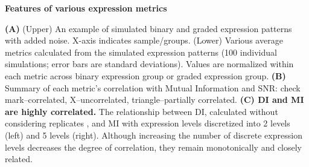 \textbf{Features of various expression metrics}

\textbf{(A)} (Upper) An example of simulated binary and graded expression patterns with added noise. X-axis indicates sample/groups. (Lower) Various average metrics calculated from the simulated expression patterns (100 individual simulations; error bars are standard deviations). Values are normalized within each metric across binary expression group or graded expression group. 
\textbf{(B)} Summary of each metric's correlation with Mutual Information and SNR: check mark--correlated, X--uncorrelated, triangle--partially correlated.
\textbf{(C) DI and MI are highly correlated.} The relationship between DI, calculated without considering replicates%
, and MI with expression levels discretized into 2 levels (left) and 5 levels (right). Although increasing the number of discrete expression levels decreases the degree of correlation, they remain monotonically and closely related.

